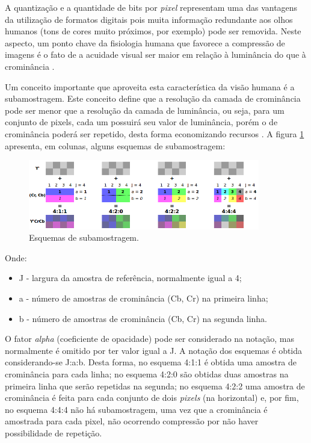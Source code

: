 A quantização e a quantidade de bits por \emph{pixel} representam uma das vantagens da utilização de formatos digitais pois muita informação redundante aos olhos humanos (tons de cores muito próximos, por exemplo) pode ser removida. Neste aspecto, um ponto chave da fisiologia humana que favorece a compressão de imagens é o fato de a acuidade visual ser maior em relação à luminância do que à crominância \cite{vandenbranden}.

Um conceito importante que aproveita esta característica da visão humana é a subamostragem. Este conceito define que a resolução da camada de crominância pode ser menor que a resolução da camada de luminância, ou seja, para um conjunto de pixels, cada um possuirá seu valor de luminância, porém o de crominância poderá ser repetido, desta forma economizando recursos \cite{brice}. A figura \ref{fig:subsampling} apresenta, em colunas, alguns esquemas de subamostragem:

\begin{figure}[!htb]
	\centering
	\includegraphics[width=0.9\textwidth]{./imgs/subsamplingschemes.png}
	\caption{Esquemas de subamostragem.}
	\label{fig:subsampling}
\end{figure}

Onde:
\begin{itemize}
	\item J - largura da amostra de referência, normalmente igual a 4;
	\item a - número de amostras de crominância (Cb, Cr) na primeira linha;
	\item b - número de amostras de crominância (Cb, Cr) na segunda linha.
\end{itemize}

O fator \emph{alpha} (coeficiente de opacidade) pode ser considerado na notação, mas normalmente é omitido por ter valor igual a J. A notação dos esquemas é obtida considerando-se J:a:b. Desta forma, no esquema 4:1:1 é obtida uma amostra de crominância para cada linha; no esquema 4:2:0 são obtidas duas amostras na primeira linha que serão repetidas na segunda; no esquema 4:2:2 uma amostra de crominância é feita para cada conjunto de dois \emph{pixels} (na horizontal) e, por fim, no esquema 4:4:4 não há subamostragem, uma vez que a crominância é amostrada para cada pixel, não ocorrendo compressão por não haver possibilidade de repetição.

